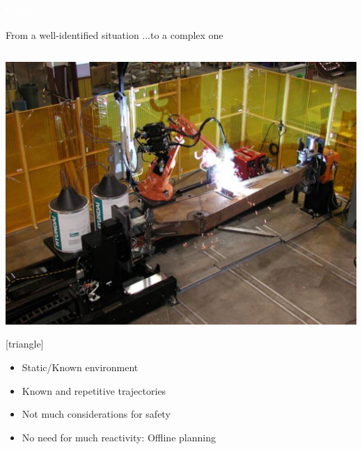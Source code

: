 \begin{frame}[noframenumbering]
  \frametitle{{\textcolor{white}{\hspace{0.3cm}Context}}}



From a well-identified situation \hspace{9mm}...\hspace{17mm}to a complex one
\begin{columns}

                \column{.47\paperwidth}
                \begin{center}
                
                        \includegraphics[width=\textwidth ]{figures/well_df_sit.pdf}
                        
[triangle]                        
\begin{itemize}
\item Static/Known environment 
\item Known and repetitive trajectories 
\item Not much considerations for safety 
\item[\hookrightarrow] No need for much reactivity: Offline planning
\end{itemize}
                        
                        
                        \end{center}


\end{columns}
\end{frame}
